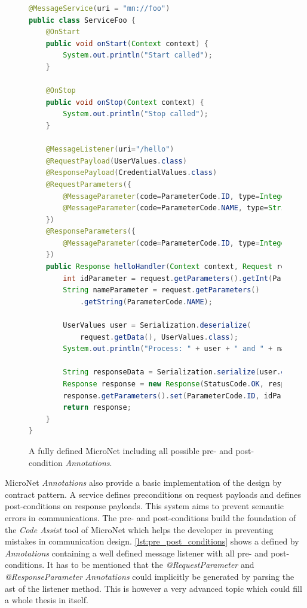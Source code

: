 \begin{figure}
\begin{lstlisting}[language=Java,firstnumber=1] 
@MessageService(uri = "mn://foo")
public class ServiceFoo {
	@OnStart
	public void onStart(Context context) {
		System.out.println("Start called");
	}
	
	@OnStop
	public void onStop(Context context) {
		System.out.println("Stop called");
	}
	
	@MessageListener(uri="/hello")
	@RequestPayload(UserValues.class) 
	@ResponsePayload(CredentialValues.class)
	@RequestParameters({
		@MessageParameter(code=ParameterCode.ID, type=Integer.class),
		@MessageParameter(code=ParameterCode.NAME, type=String.class)
	})
	@ResponseParameters({
		@MessageParameter(code=ParameterCode.ID, type=Integer.class),
	})
	public Response helloHandler(Context context, Request request) {
		int idParameter = request.getParameters().getInt(ParameterCode.ID);
		String nameParameter = request.getParameters()
			.getString(ParameterCode.NAME);
		
		UserValues user = Serialization.deserialize(
			request.getData(), UserValues.class);
		System.out.println("Process: " + user + " and " + nameParameter);

		String responseData = Serialization.serialize(user.getCredentials());
		Response response = new Response(StatusCode.OK, responseData);
		response.getParameters().set(ParameterCode.ID, idParameter);
		return response;
	}
}
\end{lstlisting}
\caption{A fully defined MicroNet \ms{} including all possible pre- and
post-condition \textit{Annotations}.}
\label{lst:pre_post_conditions}
\end{figure}

MicroNet \textit{Annotations} also provide a basic implementation of the design
by contract pattern. A service defines preconditions on request payloads and
defines post-conditions on response payloads. This system aims to prevent
semantic errors in communications. The pre- and post-conditions build the
foundation of the \textit{Code Assist} tool of MicroNet which helps the
developer in preventing mistakes in \ms{} communication design.
\autoref{lst:pre_post_conditions} shows a \ms{} defined by \textit{Annotations}
containing a well defined message listener with all pre- and post-conditions. It
has to be mentioned that the \textit{@RequestParameter} and
\textit{@ResponseParameter} \textit{Annotations} could implicitly be generated
by parsing the \gls{ast} of the listener method. This is however a very advanced
topic which could fill a whole thesis in itself.
 
